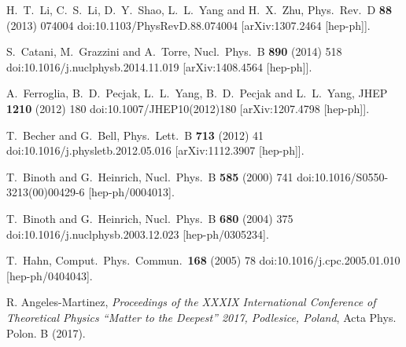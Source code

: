 \documentclass{PoS}
\begin{document}
\begin{thebibliography}{99}
  H.~T.~Li, C.~S.~Li, D.~Y.~Shao, L.~L.~Yang and H.~X.~Zhu,
  Phys.\ Rev.\ D {\bf 88} (2013) 074004
  doi:10.1103/PhysRevD.88.074004
  [arXiv:1307.2464 [hep-ph]].

  S.~Catani, M.~Grazzini and A.~Torre,
  Nucl.\ Phys.\ B {\bf 890} (2014) 518
  doi:10.1016/j.nuclphysb.2014.11.019
  [arXiv:1408.4564 [hep-ph]].

  A.~Ferroglia, B.~D.~Pecjak, L.~L.~Yang, B.~D.~Pecjak and L.~L.~Yang,
  JHEP {\bf 1210} (2012) 180
  doi:10.1007/JHEP10(2012)180
  [arXiv:1207.4798 [hep-ph]].

  T.~Becher and G.~Bell,
  Phys.\ Lett.\ B {\bf 713} (2012) 41
  doi:10.1016/j.physletb.2012.05.016
  [arXiv:1112.3907 [hep-ph]].

  T.~Binoth and G.~Heinrich,
  Nucl.\ Phys.\ B {\bf 585} (2000) 741
  doi:10.1016/S0550-3213(00)00429-6
  [hep-ph/0004013].

  T.~Binoth and G.~Heinrich,
  Nucl.\ Phys.\ B {\bf 680} (2004) 375
  doi:10.1016/j.nuclphysb.2003.12.023
  [hep-ph/0305234].

  T.~Hahn,
  Comput.\ Phys.\ Commun.\  {\bf 168} (2005) 78
  doi:10.1016/j.cpc.2005.01.010
  [hep-ph/0404043].

  R. Angeles-Martinez,
  {\it Proceedings of the XXXIX International Conference of Theoretical Physics
  ``Matter to the Deepest'' 2017, Podlesice, Poland}, 
  Acta Phys. Polon. B (2017).

\end{thebibliography}
\end{document}
